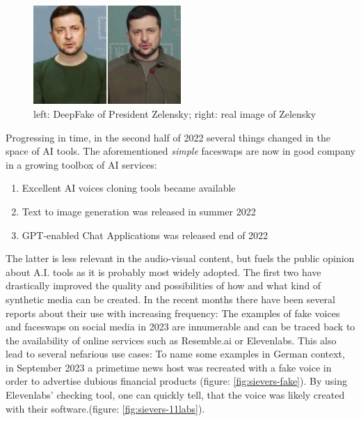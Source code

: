 \documentclass[
  a4paper,  %
  twoside,  %
  bibliography=totoc,
  headsepline,
  cleardoublepage=empty,
  parskip=half,
  draft=false
]{scrbook}
\begin{document}
\begin{figure}[h]
  \centering
  \includegraphics[width=0.5\textwidth]{./graphics/images/Zelensky.jpg}
  \caption{left: DeepFake of President Zelensky; right: real image of Zelensky \cite{universityofvirginiaZelenskyySurrenderHoax2022}}
  \label{fig:zelensky-deepfake}
\end{figure}

Progressing in time, in the second half of 2022 several things changed in the space of AI tools. The aforementioned \textit{simple} faceswaps are now in good company in a growing toolbox of AI services: 
\begin{enumerate}
  \item Excellent AI voices cloning tools became available
  \item Text to image generation was released in summer 2022
  \item GPT-enabled Chat Applications was released end of 2022
\end{enumerate}
The latter is less relevant in the audio-visual content, but fuels the public opinion about A.I. tools as it is probably most widely adopted. The first two have drastically improved the quality and possibilities of how and what kind of synthetic media can be created. In the recent months there have been several reports about their use with increasing frequency: 
The examples of fake voices and faceswaps on social media in 2023 are innumerable and can be traced back to the availability of online services such as Resemble.ai or Elevenlabs. This also lead to several nefarious use cases: To name some examples in German context, in September 2023 a primetime news host was recreated with a fake voice in order to advertise dubious financial products (figure: \ref{fig:sievers-fake}). By using Elevenlabs' checking tool, one can quickly tell, that the voice was likely created with their software.(figure: \ref{fig:sievers-11labs}). 
\end{document}
